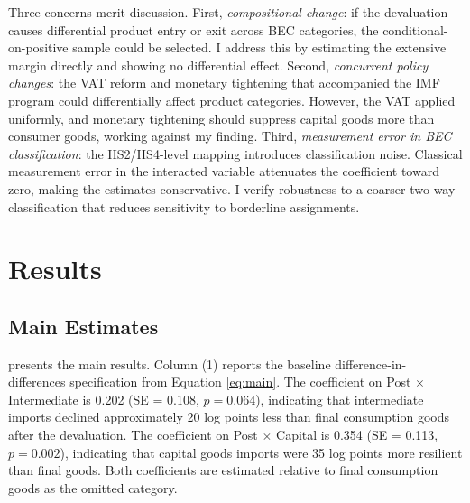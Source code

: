 \documentclass[12pt]{article}
\begin{document}
Three concerns merit discussion. First, \textit{compositional change}: if the devaluation causes differential product entry or exit across BEC categories, the conditional-on-positive sample could be selected. I address this by estimating the extensive margin directly and showing no differential effect. Second, \textit{concurrent policy changes}: the VAT reform and monetary tightening that accompanied the IMF program could differentially affect product categories. However, the VAT applied uniformly, and monetary tightening should suppress capital goods more than consumer goods, working against my finding. Third, \textit{measurement error in BEC classification}: the HS2/HS4-level mapping introduces classification noise. Classical measurement error in the interacted variable attenuates the coefficient toward zero, making the estimates conservative. I verify robustness to a coarser two-way classification that reduces sensitivity to borderline assignments.


\section{Results}

\subsection{Main Estimates}

 presents the main results. Column (1) reports the baseline difference-in-differences specification from Equation \eqref{eq:main}. The coefficient on Post $\times$ Intermediate is 0.202 (SE = 0.108, $p = 0.064$), indicating that intermediate imports declined approximately 20 log points less than final consumption goods after the devaluation. The coefficient on Post $\times$ Capital is 0.354 (SE = 0.113, $p = 0.002$), indicating that capital goods imports were 35 log points more resilient than final goods. Both coefficients are estimated relative to final consumption goods as the omitted category.
\end{document}
